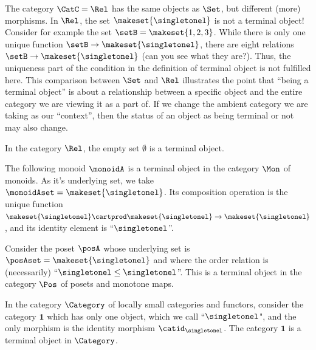 \begin{remark}
    The category $\CatC = \Rel$ has the same objects as $\Set$, but different (more) morphisms.
    In $\Rel$, the set $\makeset{ \singletonel}$ is not a terminal object! Consider for example the set $\setB = \makeset{1,2,3}$.
    While there is only one unique function $\setB \to \makeset{ \singletonel}$, there are eight relations $\setB \to \makeset{ \singletonel}$ (can you see what they are?).
    Thus, the uniqueness part of the condition in the definition of terminal object is not fulfilled here.
    This comparison between $\Set$ and $\Rel$ illustrates the point that ``being a terminal object'' is about a relationship between a specific object and the entire category we are viewing it as a part of.
    If we change the ambient category we are taking as our ``context'', then the status of an object as being terminal or not may also change.
\end{remark}

\begin{example}\label{exa:term-obj-Rel}
    In the category $\Rel$, the empty set $\emptyset$ is a terminal object.
\end{example}

\begin{example}\label{exa:term-obj-Mon}
    The following monoid $\monoidA$ is a terminal object in the category $\Mon$ of monoids.
    As it's underlying set, we take $\monoidAset = \makeset{ \singletonel}$.
    Its composition operation is the unique function $\makeset{ \singletonel} \cartprod \makeset{ \singletonel} \to \makeset{ \singletonel}$, and its identity element is ``$\singletonel$''.
\end{example}

\begin{example}\label{exa:term-obj-Pos}
    Consider the poset $\posA$ whose underlying set is $\posAset = \makeset{ \singletonel}$ and where the order relation is (necessarily) ``$\singletonel \leq \singletonel$''.
    This is a terminal object in the category $\Pos$ of posets and monotone maps.
\end{example}

\begin{example}\label{exa:term-obj-Cat}
    In the category $\Category$ of locally small categories and functors, consider the category $\mathbf{1}$ which has only one object, which we call ``$\singletonel$", and the only morphism is the identity morphism $\catid_\singletonel$.
    The category $\mathbf{1}$ is a terminal object in $\Category$.
\end{example}

